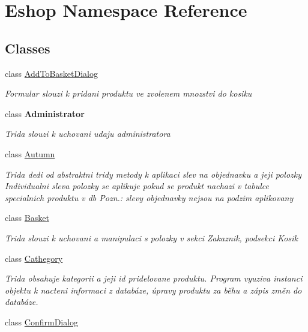 \hypertarget{namespace_eshop}{}\section{Eshop Namespace Reference}
\label{namespace_eshop}
\subsection*{Classes}
\begin{DoxyCompactItemize}
\item 
class \mbox{\hyperlink{class_eshop_1_1_add_to_basket_dialog}{Add\+To\+Basket\+Dialog}}
\begin{DoxyCompactList}\small\item\em Formular slouzi k pridani produktu ve zvolenem mnozstvi do kosiku \end{DoxyCompactList}\item 
class {\bfseries Administrator}
\begin{DoxyCompactList}\small\item\em Trida slouzi k uchovani udaju administratora \end{DoxyCompactList}\item 
class \mbox{\hyperlink{class_eshop_1_1_autumn}{Autumn}}
\begin{DoxyCompactList}\small\item\em Trida dedi od abstraktni tridy metody k aplikaci slev na objednavku a jeji polozky Individualni sleva polozky se aplikuje pokud se produkt nachazi v tabulce specialnich produktu v db Pozn.\+: slevy objednavky nejsou na podzim aplikovany \end{DoxyCompactList}\item 
class \mbox{\hyperlink{class_eshop_1_1_basket}{Basket}}
\begin{DoxyCompactList}\small\item\em Trida slouzi k uchovani a manipulaci s polozky v sekci Zakaznik, podsekci Kosik \end{DoxyCompactList}\item 
class \mbox{\hyperlink{class_eshop_1_1_cathegory}{Cathegory}}
\begin{DoxyCompactList}\small\item\em Trida obsahuje kategorii a jeji id pridelovane produktu. Program vyuziva instanci objektu k nacteni informaci z databáze, úpravy produktu za běhu a zápis změn do databáze. \end{DoxyCompactList}\item 
class \mbox{\hyperlink{class_eshop_1_1_confirm_dialog}{Confirm\+Dialog}}

\end{DoxyCompactItemize}
